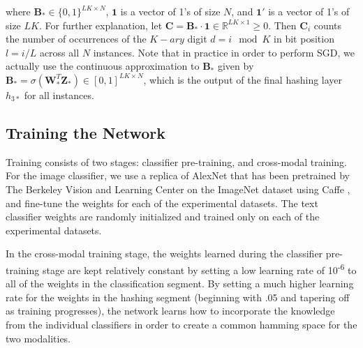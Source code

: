 \documentclass[letterpaper]{article}
\newcommand{\bpx}{\mathbf{B_\mathcal{X}}}
\newcommand{\bpy}{\mathbf{B_\mathcal{Y}}}
\newcommand{\bps}{\mathbf{B_*}}
\newcommand{\WX}{\mathbf{W}_\mathcal{X}}
\newcommand{\WY}{\mathbf{W}_\mathcal{Y}}
\newcommand{\WS}{\mathbf{W}_*}
\newcommand{\X}{\mathbf{X}}
\newcommand{\Y}{\mathbf{Y}}
\begin{document}
\noindent where $ \bps \in \{0,1\}^{LK \times N} $, $ \mathbf{1} $ is a vector of 1's of size $ N $, and $ \mathbf{1}' $ is a vector of 1's of size $ LK $. For further explanation, let $ \mathbf{C} = \bps \cdot \mathbf{1} \in \mathbb{R}^{LK \times 1} \geq 0 $. Then $ \mathbf{C}_i $ counts the number of occurrences of the $K-ary$ digit $ d = i \mod K $ in bit position $ l = i / L $ across all $ N $ instances. Note that in practice in order to perform SGD, we actually use the continuous approximation to $\bps$ given by $\bps = \sigma(\WS^T\mathbf{Z_*}) \in [0,1]^{LK \times N} $, which is the output of the final hashing layer $ h_{3*} $ for all instances.

\begin{comment}
\noindent where $ \bps \in [0,1]^{LK \times N} $ is the output of the final hashing layer $ h_{3*} $ for all instances. Thus, $ \bpx = \sigma(\WX^T\X) $ and $ \bpy = \sigma(\WY^T\Y) $. Finally, $ \mathbf{1} $ is a vector of 1's of size $ N $, and $ \mathbf{1}' $ is a vector of 1's of size $ LK $. For further explanation, let $ \mathbf{C} = \mathbf{B'_\mathcal{*}} \cdot \mathbf{1} \in \mathbb{R}^{LK \times 1} \geq 0 $. Then $ \mathbf{C}_i $ approximately counts the number of occurrences of the $K-ary$ digit $ d = i \mod K $ in bit position $ l = i / L $ across all $ N $ instances. This approximation becomes an exact count when all entries of $ \bps $ are exactly 0 or 1, which is desired.
\end{comment}

\subsection{Training the Network}

Training consists of two stages: classifier pre-training, and cross-modal training. For the image classifier, we use a replica of AlexNet that has been pretrained by The Berkeley Vision and Learning Center \footnotemark  on the ImageNet \cite{imagenet} dataset using Caffe \cite{caffe}, and fine-tune the weights for each of the experimental datasets. The text classifier weights are randomly initialized and trained only on each of the experimental datasets.

In the cross-modal training stage, the weights learned during the classifier pre-training stage are kept relatively constant by setting a low learning rate of 10\textsuperscript{-6} to all of the weights in the classification segment. By setting a much higher learning rate for the weights in the hashing segment (beginning with .05 and tapering off as training progresses), the network learns how to incorporate the knowledge from the individual classifiers in order to create a common hamming space for the two modalities.
\end{document}
